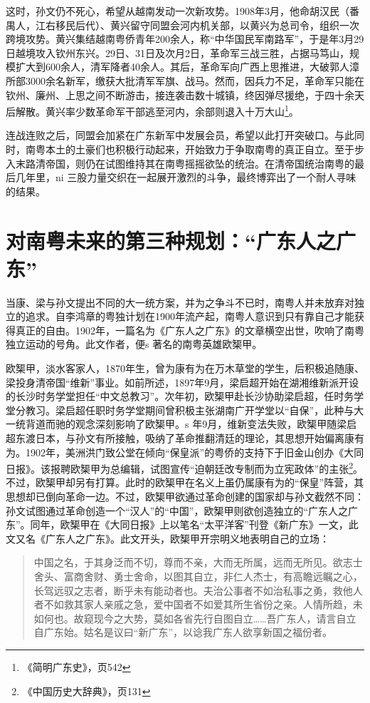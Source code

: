 这时，孙文仍不死心，希望从越南发动一次新攻势。1908年3月，他命胡汉民（番禺人，江右移民后代）、黄兴留守同盟会河内机关部，以黄兴为总司令，组织一次跨境攻势。黄兴集结越南粤侨青年200余人，称“中华国民军南路军”，于是年3月29日越境攻入钦州东兴。29日、31日及次月2日，革命军三战三胜，占据马笃山，规模扩大到600余人，清军降者40余人。其后，革命军向广西上思推进，大破郭人漳所部3000余名新军，缴获大批清军军旗、战马。然而，因兵力不足，革命军只能在钦州、廉州、上思之间不断游击，接连袭击数十城镇，终因弹尽援绝，于四十余天后解散。黄兴率少数革命军干部逃至河内，余部则退入十万大山\footnote{《简明广东史》，页542}。

连战连败之后，同盟会加紧在广东新军中发展会员，希望以此打开突破口。与此同时，南粤本土的土豪们也积极行动起来，开始致力于争取南粤的真正自立。至于步入末路清帝国，则仍在试图维持其在南粤摇摇欲坠的统治。在清帝国统治南粤的最后几年里，ni 三股力量交织在一起展开激烈的斗争，最终博弈出了一个耐人寻味的结果。

\section{对南粤未来的第三种规划：“广东人之广东”}


\indent 当康、梁与孙文提出不同的大一统方案，并为之争斗不已时，南粤人并未放弃对独立的追求。自李鸿章的粤独计划在1900年流产起，南粤人意识到只有靠自己才能获得真正的自由。1902年，一篇名为《广东人之广东》的文章横空出世，吹响了南粤独立运动的号角。此文作者，便s 著名的南粤英雄欧榘甲。

欧榘甲，淡水客家人，1870年生，曾为康有为在万木草堂的学生，后积极追随康、梁投身清帝国“维新”事业。如前所述，1897年9月，梁启超开始在湖湘维新派开设的长沙时务学堂担任“中文总教习”。次年初，欧榘甲赴长沙协助梁启超，任时务学堂分教习。梁启超任职时务学堂期间曾积极主张湖南广开学堂以“自保”，此种与大一统背道而驰的观念深刻影响了欧榘甲。s 年9月，维新变法失败，欧榘甲随梁启超东渡日本，与孙文有所接触，吸纳了革命推翻清廷的理论，其思想开始偏离康有为。1902年，美洲洪门致公堂在倾向“保皇派”的粤侨的支持下于旧金山创办《大同日报》。该报聘欧榘甲为总编辑，试图宣传“迫朝廷改专制而为立宪政体”的主张\footnote{《中国历史大辞典》，页131}。不过，欧榘甲却另有打算。此时的欧榘甲在名义上虽仍属康有为的“保皇”阵营，其思想却已倒向革命一边。不过，欧榘甲欲通过革命创建的国家却与孙文截然不同：孙文试图通过革命创造一个“汉人”的“中国”，欧榘甲则欲创造独立的“广东人之广东”。同年，欧榘甲在《大同日报》上以笔名“太平洋客”刊登《新广东》一文，此文又名《广东人之广东》。此文开头，欧榘甲开宗明义地表明自己的立场：

\begin{quote}

中国之名，于其身泛而不切，尊而不亲，大而无所属，远而无所见。欲志士舍头、富商舍财、勇士舍命，以图其自立，非仁人杰士，有高瞻远瞩之心，长驾远驭之志者，断乎未有能动者也。夫治公事者不如治私事之勇，救他人 者不如救其家人亲戚之急，爱中国者不如爱其所生省份之亲。人情所趋，未如何也。故窥现今之大势，莫如各省先行自图自立……吾广东人，请言自立自广东始。姑名是议曰“新广东”，以谂我广东人欲享新国之福份者。
\end{quote}


